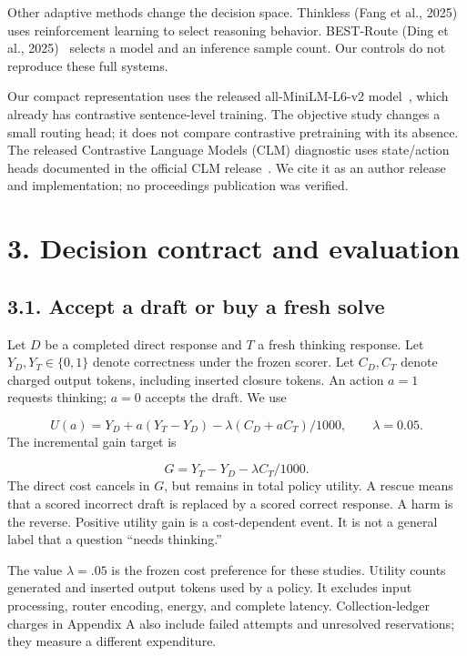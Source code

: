 \documentclass[11pt,a4paper]{article}
\begin{document}
Other adaptive methods change the decision space. Thinkless (Fang et al., 2025)~\citep{fang2025thinkless} uses reinforcement learning to select reasoning behavior. BEST-Route (Ding et al., 2025)~\citep{ding2025bestroute} selects a model and an inference sample count. Our controls do not reproduce these full systems.

Our compact representation uses the released all-MiniLM-L6-v2 model~\citep{sentencetransformersAllMiniLML6v2}, which already has contrastive sentence-level training. The objective study changes a small routing head; it does not compare contrastive pretraining with its absence. The released Contrastive Language Models (CLM) diagnostic uses state/action heads documented in the official CLM release~\citep{kwok2026clm}. We cite it as an author release and implementation; no proceedings publication was verified.

\section*{3. Decision contract and evaluation}\label{sec:3-decision-contract-and-evaluation}
\subsection*{3.1. Accept a draft or buy a fresh solve}\label{sec:31-accept-a-draft-or-buy-a-fresh-solve}
Let \(D\) be a completed direct response and \(T\) a fresh thinking response. Let \(Y_D,Y_T\in\{0,1\}\) denote correctness under the frozen scorer. Let \(C_D,C_T\) denote charged output tokens, including inserted closure tokens. An action \(a=1\) requests thinking; \(a=0\) accepts the draft. We use

\[
U(a)=Y_D+a(Y_T-Y_D)-\lambda(C_D+aC_T)/1000,\qquad \lambda=0.05.
\]
The incremental gain target is

\[
G=Y_T-Y_D-\lambda C_T/1000.
\]
The direct cost cancels in \(G\), but remains in total policy utility. A rescue means that a scored incorrect draft is replaced by a scored correct response. A harm is the reverse. Positive utility gain is a cost-dependent event. It is not a general label that a question ``needs thinking.''

The value \(\lambda=.05\) is the frozen cost preference for these studies. Utility counts generated and inserted output tokens used by a policy. It excludes input processing, router encoding, energy, and complete latency. Collection-ledger charges in Appendix A also include failed attempts and unresolved reservations; they measure a different expenditure.
\end{document}
